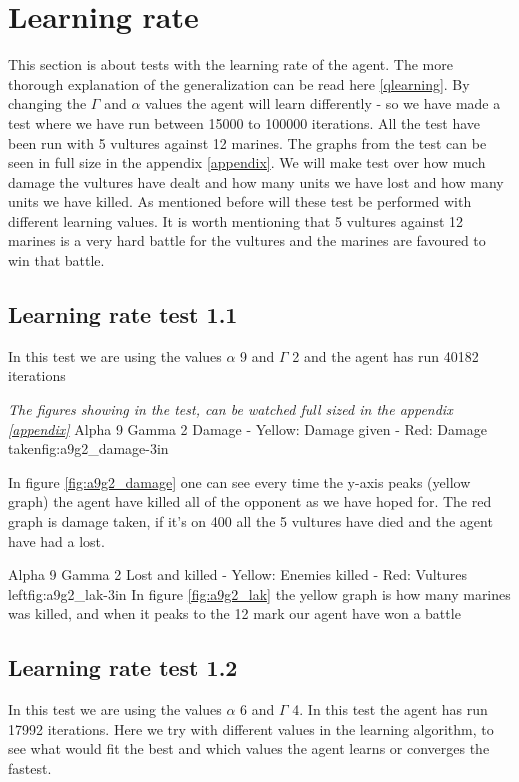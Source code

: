 \section{Learning rate}
This section is about tests with the learning rate of the agent. The more thorough explanation of the generalization can be read here \ref{qlearning}.
By changing the $\Gamma$ and $\alpha$ values the agent will learn differently - so we have made a test where we have run between 15000 to 100000 iterations. All the test have been run with 5 vultures against 12 marines. The graphs from the test can be seen in full size in the appendix \ref{appendix}. We will make test over how much damage the vultures have dealt and how many units we have lost and how many units we have killed. As mentioned before will these test be performed with different learning values. It is worth mentioning that 5 vultures against 12 marines is a very hard battle for the vultures and the marines are favoured to win that battle.

\subsection*{Learning rate test 1.1}
In this test we are using the values $\alpha$ 9 and $\Gamma$ 2 and the agent has run 40182 iterations


\textit{The figures showing in the test, can be watched full sized in the appendix \ref{appendix}} 
			{Alpha 9 Gamma 2 Damage - Yellow: Damage given - Red: Damage taken}{fig:a9g2_damage}{-3in}

In figure \ref{fig:a9g2_damage} one can see every time the y-axis peaks (yellow graph) the agent have killed all of the opponent as we have hoped for. The red graph is damage taken, if it's on 400 all the 5 vultures have died and the agent have had a lost.


			{Alpha 9 Gamma 2 Lost and killed - Yellow: Enemies killed - Red: Vultures left}{fig:a9g2_lak}{-3in}
In figure \ref{fig:a9g2_lak} the yellow graph is how many marines was killed, and when it peaks to the 12 mark our agent have won a battle


\subsection*{Learning rate test 1.2}
In this test we are using the values $\alpha$ 6 and $\Gamma$ 4. In this test the agent has run 17992 iterations. Here we try with different values in the learning algorithm, to see what would fit the best and which values the agent learns or converges the fastest.


